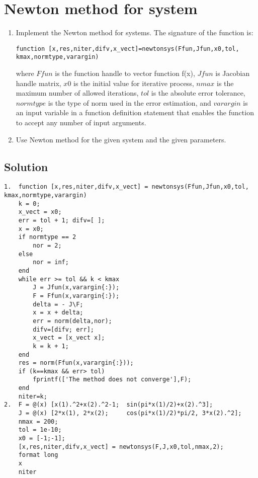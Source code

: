\documentclass[12pt, a4paper]{report}
\begin{document}
    \newpage

    \section{Newton method for system}
        \begin{enumerate}
            \item Implement the Newton method for systems. The signature of the function is:
                \begin{lstlisting}[style=Matlab]
function [x,res,niter,difv,x_vect]=newtonsys(Ffun,Jfun,x0,tol, kmax,normtype,varargin)
                \end{lstlisting}  
                where $Ffun$ is the function handle to vector function f(x), $Jfun$ is Jacobian handle matrix, $x0$ is the initial value for iterative process, $nmax$ is the 
                maximum number of allowed iterations, $tol$ is the absolute error tolerance, $normtype$ is the type of norm used in the error estimation, and $varargin$ is an input 
                variable in a function definition statement that enables the function to accept any number of input arguments. 
            \item Use Newton method for the given system and the given parameters. 
        \end{enumerate}
    \subsection*{Solution}
        \begin{lstlisting}[style=Matlab]
1.  function [x,res,niter,difv,x_vect] = newtonsys(Ffun,Jfun,x0,tol, kmax,normtype,varargin)
    k = 0;
    x_vect = x0;
    err = tol + 1; difv=[ ];
    x = x0;
    if normtype == 2
        nor = 2;
    else
        nor = inf;
    end
    while err >= tol && k < kmax
        J = Jfun(x,varargin{:});
        F = Ffun(x,varargin{:});
        delta = - J\F;
        x = x + delta;
        err = norm(delta,nor); 
        difv=[difv; err];
        x_vect = [x_vect x];
        k = k + 1;
    end
    res = norm(Ffun(x,varargin{:}));
    if (k==kmax && err> tol)
        fprintf(['The method does not converge'],F);
    end
    niter=k;          
2.  F = @(x) [x(1).^2+x(2).^2-1;  sin(pi*x(1)/2)+x(2).^3];
    J = @(x) [2*x(1), 2*x(2);     cos(pi*x(1)/2)*pi/2, 3*x(2).^2];
    nmax = 200;
    tol = 1e-10;
    x0 = [-1;-1];
    [x,res,niter,difv,x_vect] = newtonsys(F,J,x0,tol,nmax,2);
    format long                       
    x
    niter
        \end{lstlisting}  
\end{document}
